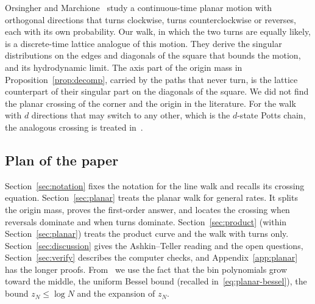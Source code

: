 Orsingher and Marchione~\cite{orsinghermarchione2025} study a continuous-time
planar motion with orthogonal directions that turns clockwise, turns
counterclockwise or reverses, each with its own probability. Our walk, in which
the two turns are equally likely, is a discrete-time lattice analogue of this
motion. They derive the singular distributions on the edges and diagonals of
the square that bounds the motion, and its hydrodynamic limit. The axis part
of the origin mass in Proposition~\ref{prop:decomp}, carried by the paths that
never turn, is the lattice counterpart of their singular part on the diagonals
of the square. We did not find the planar crossing of the corner and the
origin in the literature. For the walk with $d$ directions that may switch to
any other, which is the $d$-state Potts chain, the analogous crossing is
treated in~\cite{paperB}.

\subsection{Plan of the paper}\label{sec:plan}

Section~\ref{sec:notation} fixes the notation for the line walk and recalls its crossing equation.
Section~\ref{sec:planar} treats the planar walk for general rates. It splits the origin mass,
proves the first-order answer, and locates the crossing when reversals dominate and when turns
dominate. Section~\ref{sec:product} (within Section~\ref{sec:planar}) treats the product curve
and the walk with turns only.
Section~\ref{sec:discussion} gives the Ashkin--Teller reading and the open
questions, Section~\ref{sec:verify} describes the computer checks, and
Appendix~\ref{app:planar} has the longer proofs. From~\cite{paperA} we use the
fact that the bin polynomials grow toward the middle, the uniform Bessel bound
(recalled in~\eqref{eq:planar-bessel}), the bound $z_N\le\log N$ and the expansion of $z_N$.
